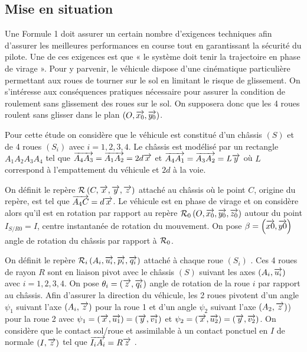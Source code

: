 \documentclass[10pt,fleqn]{article} %
\begin{document}

\vspace{4.4cm}
\pagestyle{fancy}
\thispagestyle{plain}


\def\columnseprulecolor{\color{ocre}}
\setlength{\columnseprule}{0.4pt} 

\ifprof
\else
\begin{multicols}{2}
\fi


\subsection*{Mise en situation}
Une Formule 1 doit assurer un certain nombre d’exigences techniques afin d’assurer les meilleures performances en course tout en garantissant la sécurité du pilote. Une de ces exigences est que « le système doit tenir la trajectoire en phase de virage ». Pour y parvenir, le véhicule dispose d'une cinématique particulière permettant aux roues de tourner sur le sol en limitant le risque de glissement. On s'intéresse aux conséquences pratiques nécessaire pour assurer la condition de roulement sans glissement des roues sur le sol. On supposera donc que les 4 roues roulent sans glisser dans le plan
$\left(O,\overrightarrow{x_0},\overrightarrow{y_0}\right)$. 


Pour cette étude on considère que le véhicule est constitué d’un châssis \textbf{$(S)$} et de 4 roues \textbf{$(S_i)$}
 avec $i=1,2,3,4$.  Le châssis est modélisé par un rectangle $A_1A_2A_3A_4$ tel que 
 $\overrightarrow{A_4 A_3}=\overrightarrow{A_1 A_2}=2d\overrightarrow{x}$ et $\overrightarrow{A_4 A_1}=\overrightarrow{A_3 A_2}=L\overrightarrow{y}$  où $L$ correspond à l’empattement du véhicule et $2d$ à la voie. 


On définit le repère $\mathcal{R}_{}\left({C},\overrightarrow{x},\overrightarrow{y},\overrightarrow{z}\right)$ attaché au châssis où le point $C$, origine du repère, est tel que 
$\overrightarrow{A_4 C}= d\overrightarrow{x}$. Le véhicule est en phase de virage et on considère alors qu’il est en rotation par rapport au
repère $\mathcal{R}_{0}\left({O},\overrightarrow{x_0},\overrightarrow{y_0},\overrightarrow{z_0}\right)$ autour du point $I_{S/R0} = I$, centre instantanée de rotation du mouvement. On pose $\beta=\left(\overrightarrow{x0},\overrightarrow{y0}\right)$  angle de rotation du châssis par rapport à $\mathcal{R}_{0}$. 

On définit le repère $\mathcal{R}_{i}\left({A_i},\overrightarrow{u_i},\overrightarrow{p_i},\overrightarrow{q_i}\right)$ attaché à chaque roue $(S_i)$ . Ces 4 roues de rayon $R$ sont en
liaison pivot avec le châssis $(S)$ suivant les axes $\left(A_i,\overrightarrow{u_i}\right)$ avec 
$i=1,2,3,4$. On pose $\theta_i=\left(\overrightarrow{z},\overrightarrow{q_i}\right)$ angle de rotation de la roue $i$ par rapport au châssis. 
Afin d’assurer la direction du véhicule, les 2 roues pivotent d’un angle $\psi_1$ suivant l’axe $\left(A_i,\overrightarrow{z}\right)$ pour la roue 1 et d’un angle $\psi_2$ suivant l’axe $\left(A_2,\overrightarrow{z}\right)$) pour la roue 2 avec $\psi_1=\left(\overrightarrow{x},\overrightarrow{u_1}\right)=\left(\overrightarrow{y},\overrightarrow{v_1}\right)$ et $\psi_2=\left(\overrightarrow{x},\overrightarrow{u_2}\right)=\left(\overrightarrow{y},\overrightarrow{v_2}\right)$. 
On considère que le contact sol/roue et assimilable à un contact ponctuel en $I$ de normale $\left(I,\overrightarrow{z}\right)$ tel que $\overrightarrow{I_i A_i}=R\overrightarrow{z}$ .  




\end{multicols}
\end{document}
